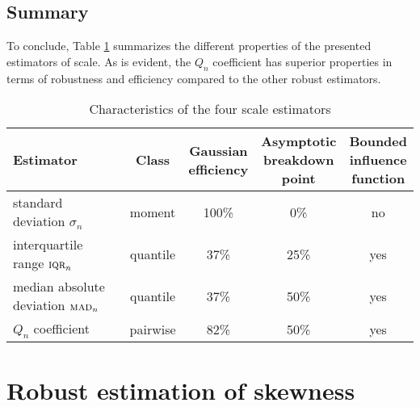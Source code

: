 \begin{stlog}

\end{stlog}

\subsection{Summary}

To conclude, Table \ref{tab:stat:scale} summarizes the different properties of the
presented estimators of scale. As is evident, the $Q_n$ coefficient has superior
properties in terms of robustness and efficiency compared to the other robust 
estimators.

\begin{table}[h!]
    \centering
    \caption{Characteristics of the four scale estimators}
    \label{tab:stat:scale}
    \begin{tabular}{lcccc}
        \toprule
        Estimator
        & Class  
        & \subtab{c}{Gaussian\\ efficiency}
        & \subtab{c}{Asymptotic\\ breakdown\\ point} 
        & \subtab{c}{Bounded\\ influence\\ function}
        \\\midrule
        standard deviation $\sigma_n$              & moment   & 100\% &  0\% & no
        \\\addlinespace
        interquartile range $\stsc{IQR}_n$       & quantile & 37\%  & 25\% & yes
        \\\addlinespace
        median absolute deviation $\stsc{MAD}_n$ & quantile & 37\%  & 50\% & yes
        \\\addlinespace
        $Q_n$ coefficient                 & pairwise & 82\%  & 50\% & yes
        \\\bottomrule
    \end{tabular}
\end{table}



\section{Robust estimation of skewness}
\label{subsec:skewness}

